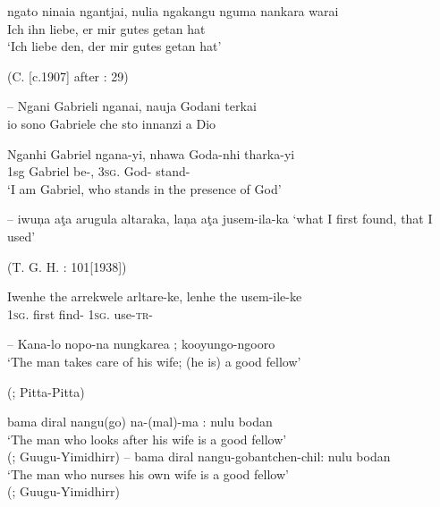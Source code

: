 \documentclass{langscibook}
\begin{document}
\begin{xlist}
\begin{xlist}
\begin{xlist}
\ea
\gll    \label{bkm:Ref77507345}ngato    ninaia    ngantjai,    nulia   ngakangu    nguma   nankara   warai\\
Ich ihn liebe, er mir gutes getan hat\\
\glt `Ich liebe den, der mir gutes getan hat'

(C. \citealt{strehlow_grammatik_1931} [c.1907] after \citealt{reuther_dieri_1894}: 29)
\z




--
\ea
      \label{bkm:Ref77507401}Ngani   Gabrieli   nganai,          nauja    Godani    terkai\\
 \glt io sono Gabriele che sto innanzi a Dio

\citep[67]{gatti_lingua_1930}

\gll Nganhi Gabriel    ngana-yi,     nhawa   Goda-nhi tharka-yi\\
    1sg Gabriel  be-,     3\textsc{sg}.   God-  stand-\\
\glt `I am Gabriel, who stands in the presence of God'
\z

--
\ea
iwu\c{n}a              aţa      arugula   altaraka,      la\c{n}a    aţa      jusem-ila-ka
\glt `what I first found, that I used'

(T. G. H. \citealt{strehlow_aranda_1944}: 101[1938])


\gll Iwenhe             the     arrekwele    arltare-ke,       lenhe   the     usem-ile-ke\\
               1\textsc{sg}.      first              find-         1\textsc{sg}.   use-\textsc{tr}-\\
\z

--
\ea
\label{bkm:Ref465086262}Kana-lo nopo-na nungkarea ; kooyungo-ngooro\\
\glt `The man takes care of his wife; (he is) a good fellow'

(\citealt[24]{roth_ethnological_1897}; Pitta-Pitta)

       \label{bkm:Ref465086269}bama diral nangu(go) na-(mal)-ma : nulu bodan\\
\glt `The man who looks after his wife is a good fellow' \\

(\citealt[no pag.]{schwarz_koko_1900}; Guugu-Yimidhirr)
\z
--
\ea
        \label{bkm:Ref339469326}bama diral nangu-gobantchen-chil: nulu bodan\\
\glt `The man who nurses his own wife is a good fellow' \\
(\citealt[18]{roth_structure_1901}; Guugu-Yimidhirr)
\z


\end{xlist}
\end{xlist}
\end{xlist}
\end{document}
